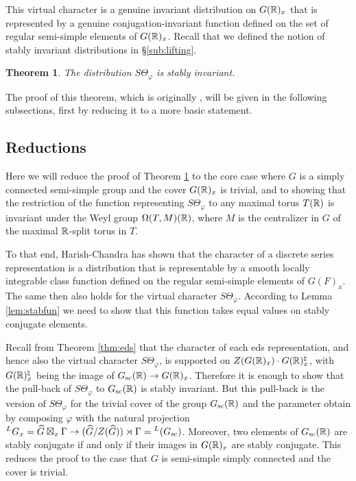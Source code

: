 \documentclass{article}
\newtheorem{thm}{Theorem}[subsection]
\theoremstyle{definition}
\numberwithin{equation}{section}
\renewcommand{\-}{\hyp{}}
\begin{document}
This virtual character is a genuine invariant distribution on $G(\mathbb{R})_x$ that is represented by a genuine conjugation-invariant function defined on the set of regular semi-simple elements of $G(\mathbb{R})_x$. Recall that we defined the notion of stably invariant distributions in \S\ref{sub:lifting}.

\begin{thm} \label{thm:stab}
	The distribution $S\Theta_\varphi$ is stably invariant.
\end{thm}

The proof of this theorem, which is originally \cite[Lemma 5.2]{She79C}, will be given in the following subsections, first by reducing it to a more basic statement.

\subsection{Reductions}

Here we will reduce the proof of Theorem \ref{thm:stab} to the core case where $G$ is a simply connected semi-simple group and the cover $G(\mathbb{R})_x$ is trivial, and to showing that the restriction of the function representing $S\Theta_\varphi$ to any maximal torus $T(\mathbb{R})$ is invariant under the Weyl group $\Omega(T,M)(\mathbb{R})$, where $M$ is the centralizer in $G$ of the maximal $\mathbb{R}$-split torus in $T$.

To that end, Harish-Chandra has shown that the character of a discrete series representation is a distribution that is representable by a smooth locally integrable class function defined on the regular semi-simple elements of $G(F)_x$. The same then also holds for the virtual character $S\Theta_\varphi$. According to Lemma \ref{lem:stabfun} we need to show that this function takes equal values on stably conjugate elements.


Recall from Theorem \ref{thm:eds} that the character of each eds representation, and hence also the virtual character $S\Theta_\varphi$, is supported on $Z(G(\mathbb{R})_x) \cdot G(\mathbb{R})_x^\natural$, with $G(\mathbb{R})_x^\natural$ being the image of $G_{\textrm{sc}}(\mathbb{R}) \to G(\mathbb{R})_x$. Therefore it is enough to show that the pull-back of $S\Theta_\varphi$ to $G_{\textrm{sc}}(\mathbb{R})$ is stably invariant. But this pull-back is the version of $S\Theta_\varphi$ for the trivial cover of the group $G_{\textrm{sc}}(\mathbb{R})$ and the parameter obtain by composing $\varphi$ with the natural projection $^LG_x = \widehat G \boxtimes_x \Gamma \to (\widehat G/Z(\widehat G)) \rtimes \Gamma = {^L(G_{\textrm{sc}})}$. Moreover, two elements of $G_{\textrm{sc}}(\mathbb{R})$ are stably conjugate if and only if their images in $G(\mathbb{R})_x$ are stably conjugate. This reduces the proof to the case that $G$ is semi-simple simply connected and the cover is trivial.
\end{document}
